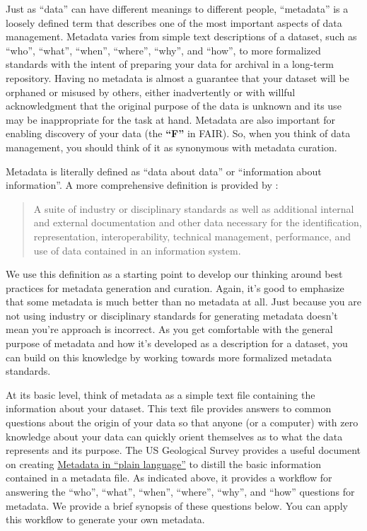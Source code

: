 \documentclass[
]{book}
\begin{document}
Just as ``data'' can have different meanings to different people, ``metadata'' is a loosely defined term that describes one of the most important aspects of data management. Metadata varies from simple text descriptions of a dataset, such as ``who'', ``what'', ``when'', ``where'', ``why'', and ``how'', to more formalized standards with the intent of preparing your data for archival in a long-term repository. Having no metadata is almost a guarantee that your dataset will be orphaned or misused by others, either inadvertently or with willful acknowledgment that the original purpose of the data is unknown and its use may be inappropriate for the task at hand. Metadata are also important for enabling discovery of your data (the \textbf{``F''} in FAIR). So, when you think of data management, you should think of it as synonymous with metadata curation.

Metadata is literally defined as ``data about data'' or ``information about information''. A more comprehensive definition is provided by \citet{Gilliland16}:

\begin{quote}
A suite of industry or disciplinary standards as well as additional internal and external documentation and other data necessary for the identification, representation, interoperability, technical management, performance, and use of data contained in an information system.
\end{quote}

We use this definition as a starting point to develop our thinking around best practices for metadata generation and curation. Again, it's good to emphasize that some metadata is much better than no metadata at all. Just because you are not using industry or disciplinary standards for generating metadata doesn't mean you're approach is incorrect. As you get comfortable with the general purpose of metadata and how it's developed as a description for a dataset, you can build on this knowledge by working towards more formalized metadata standards.

At its basic level, think of metadata as a simple text file containing the information about your dataset. This text file provides answers to common questions about the origin of your data so that anyone (or a computer) with zero knowledge about your data can quickly orient themselves as to what the data represents and its purpose. The US Geological Survey provides a useful document on creating \href{https://prd-wret.s3.us-west-2.amazonaws.com/assets/palladium/production/atoms/files/Metadata\%20in\%20Plain\%20Language_508compliant.pdf}{Metadata in ``plain language''} to distill the basic information contained in a metadata file. As indicated above, it provides a workflow for answering the ``who'', ``what'', ``when'', ``where'', ``why'', and ``how'' questions for metadata. We provide a brief synopsis of these questions below. You can apply this workflow to generate your own metadata.
\end{document}
